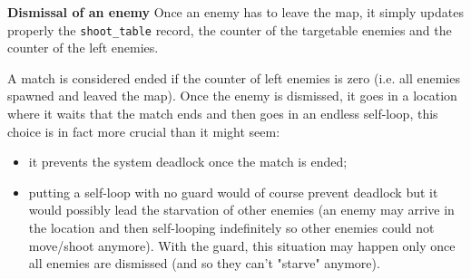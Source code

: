 \documentclass[
10pt, %
a4paper, %
oneside, %
headinclude,footinclude, %
BCOR5mm, %
]{scrartcl}
\begin{document}
				\begin{flushleft}
					\textbf{Dismissal of an enemy}
					Once an enemy has to leave the map, it simply updates properly the \texttt{shoot\_table} record, the counter of the targetable enemies and the counter of the left enemies.
					
					A match is considered ended if the counter of left enemies is zero (i.e. all enemies spawned and leaved the map). Once the enemy is dismissed, it goes in a location where it waits that the match ends and then goes in an endless self-loop, this choice is in fact more crucial than it might seem:
					\begin{itemize}
						\item it prevents the system deadlock once the match is ended;
						\item putting a self-loop with no guard would of course prevent deadlock but it would possibly lead the starvation of other enemies (an enemy may arrive in the location and then self-looping indefinitely so other enemies could not move/shoot anymore). With the guard, this situation may happen only once all enemies are dismissed (and so they can't "starve" anymore).
					\end{itemize}
				\end{flushleft}
\end{document}
